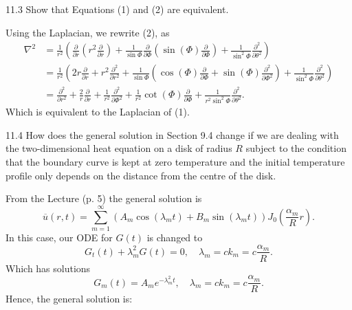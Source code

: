 \begin{problem}{11.3}
  Show that Equations (1) and (2) are equivalent.
\end{problem}

\begin{derivation}
  Using the Laplacian, we rewrite (2), as
  \begin{align*}
    \nabla ^2 &= \frac{1}{r^2} \left( \frac{\partial }{\partial r} \left( r^2 \frac{\partial }{\partial r}  \right) + \frac{1}{\sin \Phi} \frac{\partial }{\partial \Phi} \left( \sin (\Phi) \frac{\partial }{\partial \Phi}  \right) + \frac{1}{\sin^2 \Phi} \frac{\partial ^2}{\partial \theta^2}  \right) \\
    &= \frac{1}{r^2} \left( 2r \frac{\partial }{\partial r}  + r^2 \frac{\partial ^2}{\partial r^2} + \frac{1}{\sin \Phi} \left( \cos (\Phi) \frac{\partial}{\partial \Phi} + \sin(\Phi) \frac{\partial ^2}{\partial \Phi^2}  \right) + \frac{1}{\sin^2 \Phi} \frac{\partial ^2}{\partial \theta^2}  \right) \\
    &= \frac{\partial ^2}{\partial r^2}  + \frac{2}{r} \frac{\partial }{\partial r} + \frac{1}{r^2} \frac{\partial ^2}{\partial \Phi^2}  + \frac{1}{r^2} \cot (\Phi) \frac{\partial }{\partial \Phi} + \frac{1}{r^2 \sin^2\Phi} \frac{\partial^2}{\partial \theta^2} 
  .\end{align*}
  Which is equivalent to the Laplacian of (1).
\end{derivation}

\newpage

\begin{problem}{11.4}
  How does the general solution in Section 9.4 change if we are dealing with the two-dimensional heat equation on a disk of radius $R$ subject to the condition that the boundary curve is kept at zero temperature and the initial temperature profile only depends on the distance from the centre of the disk.
\end{problem}

\begin{derivation}
  From the Lecture (p. 5) the general solution is
  \begin{equation*}
    \overline{u}(r,t) = \sum_{m = 1}^{\infty} \left( A_m \cos (\lambda_m t) + B_m \sin (\lambda_m t) \right) J_0 \left( \frac{\alpha_m}{R}r \right) 
  .\end{equation*}
  In this case, our ODE for $G(t)$ is changed to
  \begin{equation*}
    G_t(t) + \lambda_m^2 G(t) = 0, \quad \lambda_m = ck_m = c \frac{\alpha_m}{R}
  .\end{equation*}
  Which has solutions
  \begin{equation*}
    G_m(t) = A_m e^{-\lambda_m^2 t}, \quad \lambda_m = ck_m = c \frac{\alpha_m}{R}
  .\end{equation*}
  Hence, the general solution is:
\end{derivation}

